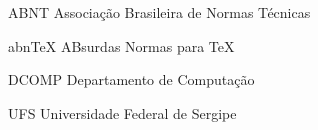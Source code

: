 
\begin{siglas}
	\item[ABNT]{Associação Brasileira de Normas Técnicas}
	\item[abnTeX]{ABsurdas Normas para TeX}
  	\item[DCOMP]{Departamento de Computação}
	\item[UFS]{Universidade Federal de Sergipe}
\end{siglas}